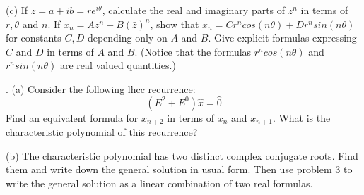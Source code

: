 \documentclass[12 pt]{article}
\begin{document}
\noindent
(c) If $z=a+ib=re^{i \theta}$, calculate the real and imaginary parts of $z^n$ in terms of $r, \theta$ and $n$. 
If $x_n = Az^n + B(\bar{z})^n$, show that $x_n = Cr^ncos(n \theta) + Dr ^nsin(n \theta)$ for constants $C, D$ depending only 
on $A$ and $B$. Give explicit formulas expressing $C$ and $D$ in terms of $A$ and $B$. (Notice that the formulas $r^n cos(n \theta)$ 
and $r^n sin(n \theta)$ are real valued quantities.)

\medskip

.
(a) Consider the following lhcc recurrence:
$$
(E^2 + E^0)\hat{x} = \hat{0}
$$
Find an equivalent formula for $x_{n+2}$ in terms of $x_n$ and $x_{n+1}$. What is the characteristic polynomial of this recurrence?

\noindent
(b) The characteristic polynomial has two distinct complex conjugate roots. Find them and write down the general solution in usual form. 
Then use problem 3 to write the general solution as a linear combination of two real formulas.
 
\end{document}
